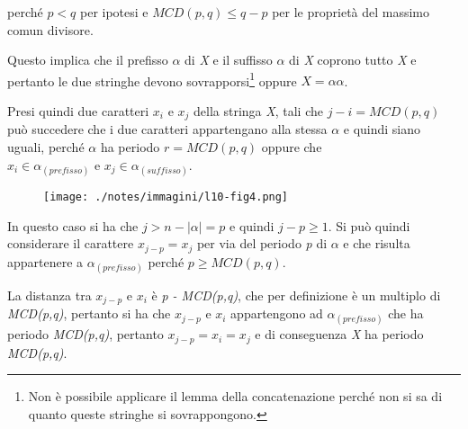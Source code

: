 perché $ p < q $ per ipotesi e $ MCD(p,q) \leq q - p $ per le proprietà del massimo comun divisore.

Questo implica che il prefisso $ \alpha $ di \textit{X} e il suffisso $ \alpha $ di \textit{X} coprono tutto \textit{X} e pertanto le due stringhe devono sovrapporsi\footnote{Non è possibile applicare il lemma della concatenazione perché non si sa di quanto queste stringhe si sovrappongono.} oppure $ X = \alpha\alpha $.

Presi quindi due caratteri $ x_i $ e $ x_j $ della stringa \textit{X}, tali che $ j - i = MCD(p,q) $ può succedere che i due caratteri appartengano alla stessa $ \alpha $ e quindi siano uguali, perché $ \alpha $ ha periodo $ r = MCD(p,q) $ oppure che $x_i \in \alpha_{(prefisso)} \text{ e } x_j \in \alpha_{(suffisso)} $.

\begin{figure}[htbp]
	\centering
	\texttt{[image: ./notes/immagini/l10-fig4.png]}
\end{figure}


In questo caso si ha che $ j > n - |\alpha| = p $ e quindi $ j - p \geq 1$. Si può quindi considerare il carattere $ x_{j-p} = x_j$ per via del periodo \textit{p} di $ \alpha $ e che risulta appartenere a $ \alpha_{(prefisso)} $ perché $ p \geq MCD(p,q) $.

La distanza tra $ x_{j-p} \text{ e } x_i$ è \textit{p - MCD(p,q)}, che per definizione è un multiplo di \textit{MCD(p,q)}, pertanto si ha che $ x_{j-p} \text{ e } x_i$ appartengono ad $ \alpha_{(prefisso)} $ che ha periodo \textit{MCD(p,q)}, pertanto $ x_{j-p} = x_i = x_j $ e di conseguenza \textit{X} ha periodo \textit{MCD(p,q)}.

